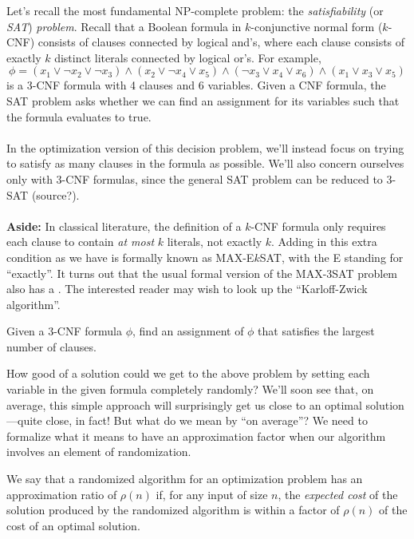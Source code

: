 \documentclass{article}
\newenvironment{definition}[2][Definition]{\begin{trivlist}
\item[\hskip \labelsep {\bfseries #1}\hskip \labelsep {\bfseries #2.}]}{\end{trivlist}}
\newenvironment{envsection}[1]{\begin{trivlist}
\item[\hskip \labelsep {\bfseries #1}]}{\end{trivlist}}
\begin{document}
Let's recall the most fundamental NP-complete problem: the \textit{satisfiability} (or \textit{SAT}) \textit{problem}. Recall that a Boolean formula in $k$-conjunctive normal form ($k$-CNF) consists of clauses connected by logical and's, where each clause consists of exactly $k$ distinct literals connected by logical or's. For example,
\[
\phi = (x_1 \lor \neg x_2 \lor \neg x_3) \land (x_2 \lor \neg x_4 \lor x_5) \land (\neg x_3 \lor x_4 \lor x_6) \land (x_1 \lor x_3 \lor x_5)
\]
is a 3-CNF formula with 4 clauses and 6 variables. Given a CNF formula, the SAT problem asks whether we can find an assignment for its variables such that the formula evaluates to true.\\
\\
In the optimization version of this decision problem, we'll instead focus on trying to satisfy as many clauses in the formula as possible. We'll also concern ourselves only with 3-CNF formulas, since the general SAT problem can be reduced to 3-SAT (source?).\\
\\
\textbf{Aside:} In classical literature, the definition of a $k$-CNF formula only requires each clause to contain \textit{at most} $k$ literals, not exactly $k$. Adding in this extra condition as we have is formally known as MAX-E$k$SAT, with the E standing for ``exactly''. It turns out that the usual formal version of the MAX-3SAT problem also has a . The interested reader may wish to look up the ``Karloff-Zwick algorithm''.

\begin{envsection}{Optimization Problem (MAX-$3$SAT)}
    Given a 3-CNF formula $\phi$, find an assignment of $\phi$ that satisfies the largest number of clauses.
\end{envsection}

\noindent How good of a solution could we get to the above problem by setting each variable in the given formula completely randomly? We'll soon see that, on average, this simple approach will surprisingly get us close to an optimal solution---quite close, in fact! But what do we mean by ``on average''? We need to formalize what it means to have an approximation factor when our algorithm involves an element of randomization.

\begin{definition}{(Randomized Approximation Algorithm)}{}
    We say that a randomized algorithm for an optimization problem has an approximation ratio of $\rho(n)$ if, for any input of size $n$, the \textit{expected cost} of the solution produced by the randomized algorithm is within a factor of $\rho(n)$ of the cost of an optimal solution.
\end{definition}
\end{document}
